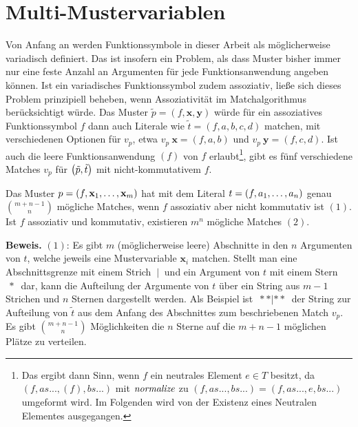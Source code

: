 \section{Multi-Mustervariablen} \label{subsecMulti}

Von Anfang an werden Funktionssymbole in dieser Arbeit als möglicherweise variadisch definiert. Das ist insofern ein Problem, als dass Muster bisher immer nur eine feste Anzahl an Argumenten für jede Funktionsanwendung angeben können. Ist ein variadisches Funktionssymbol zudem assoziativ, ließe sich dieses Problem prinzipiell beheben, wenn Assoziativität im Matchalgorithmus berücksichtigt würde. Das Muster $\tilde p = (f, \mathbf x, \mathbf y)$ würde für ein assoziatives Funktionssymbol $f$ dann auch Literale wie $\tilde t = (f, a, b, c, d)$ matchen, mit verschiedenen Optionen für $v_p$, etwa $v_p~\mathbf x = (f, a, b)$ und $v_p~\mathbf y = (f, c, d)$. Ist auch die leere Funktionsanwendung $(f)$ von $f$ erlaubt\footnote{Das ergibt dann Sinn, wenn $f$ ein neutrales Element $e \in T$ besitzt, da $(f, as..., (f), bs...)$ mit $\Const{normalize}$ zu $(f, as..., bs...) = (f, as..., e, bs...)$ umgeformt wird. Im Folgenden wird von der Existenz eines Neutralen Elementes ausgegangen.}, gibt es fünf verschiedene Matches $v_p$ für $\paren*{\tilde p, \tilde t}$ mit nicht-kommutativem $f$.

\begin{lemma} \label{lemNrAssocMatches}
Das Muster $p = (f, \elems {\mathbf x} 1 m)$ hat mit dem Literal $t = (f, \elems a 1 n)$ genau ${m + n - 1}\choose n$ mögliche Matches, wenn $f$ assoziativ aber nicht kommutativ ist $(1)$. Ist $f$ assoziativ und kommutativ, existieren $m^n$ mögliche Matches $(2)$.\\
\end{lemma}

\textbf{Beweis.}
$(1)$: Es gibt $m$ (möglicherweise leere) Abschnitte in den $n$ Argumenten von $t$, welche jeweils eine Mustervariable $\mathbf x_i$ matchen. Stellt man eine Abschnittsgrenze mit einem Strich $~|~$ und ein Argument von $t$ mit einem Stern $~*~$ dar, kann die Aufteilung der Argumente von $t$ über ein String aus $m - 1$ Strichen und $n$ Sternen dargestellt werden. 
Als Beispiel ist $~**|**~$ der String zur Aufteilung von $\tilde t$ aus dem Anfang des Abschnittes zum beschriebenen Match $v_p$.
Es gibt ${m + n - 1}\choose n$ Möglichkeiten die $n$ Sterne auf die ${m + n - 1}$ möglichen Plätze zu verteilen.\\

